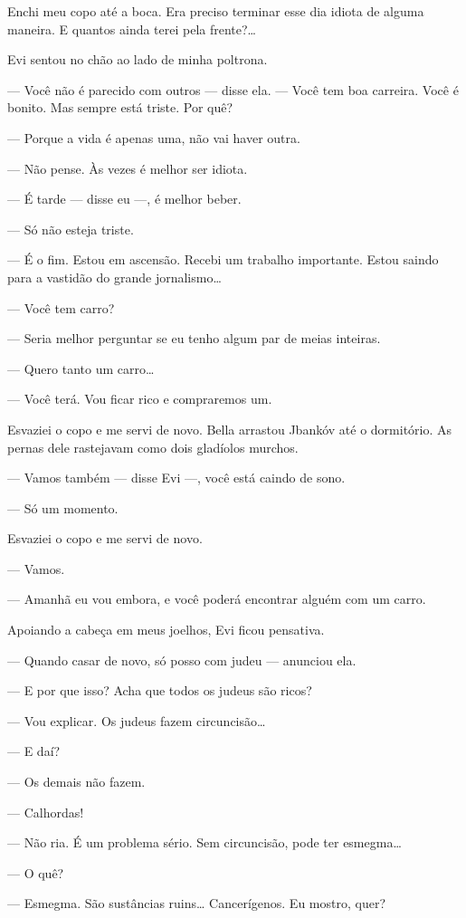 Enchi meu copo até a boca. Era preciso terminar esse dia idiota de
alguma maneira. E quantos ainda terei pela frente?\ldots{}

Evi sentou no chão ao lado de minha poltrona.

--- Você não é parecido com outros --- disse ela.
--- Você tem boa carreira. Você é bonito. Mas sempre está triste.
Por quê?

--- Porque a vida é apenas uma, não vai haver outra.

--- Não pense. Às vezes é melhor ser idiota.

--- É tarde --- disse eu ---, é melhor beber.

--- Só não esteja triste.

--- É o fim. Estou em ascensão. Recebi um trabalho importante.
Estou saindo para a vastidão do grande jornalismo\ldots{}

--- Você tem carro?

--- Seria melhor perguntar se eu tenho algum par de meias
inteiras.

--- Quero tanto um carro\ldots{}

--- Você terá. Vou ficar rico e compraremos um.

Esvaziei o copo e me servi de novo. Bella arrastou Jbankóv até o
dormitório. As pernas dele rastejavam como dois gladíolos murchos.

--- Vamos também --- disse Evi ---, você está
caindo de sono.

--- Só um momento.

Esvaziei o copo e me servi de novo.

--- Vamos.

--- Amanhã eu vou embora, e você poderá encontrar alguém com um
carro.

Apoiando a cabeça em meus joelhos, Evi ficou pensativa.

--- Quando casar de novo, só posso com judeu --- anunciou
ela.

--- E por que isso? Acha que todos os judeus são ricos?

--- Vou explicar. Os judeus fazem circuncisão\ldots{}

--- E daí?

--- Os demais não fazem.

--- Calhordas!

--- Não ria. É um problema sério. Sem circuncisão, pode ter
esmegma\ldots{}

--- O quê?

--- Esmegma. São sustâncias ruins\ldots{} Cancerígenos. Eu mostro,
quer?

